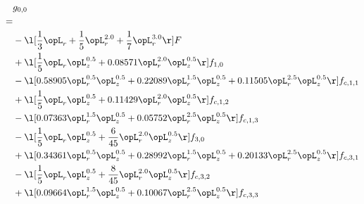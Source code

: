 \begin{alignat}{2} 
\label{eq:g_00_0} 
& g_{0,0} \nonumber \\ 
 = \\ 
& - \l[ \frac{1}{3} \opL_r + \frac{1}{5} \opL_r^{2.0} + \frac{1}{7} \opL_r^{3.0}  \r] F \nonumber \\ 
& + \l[ \frac{1}{5} \opL_r \opL_z^{0.5} +  0.08571 \opL_r^{2.0} \opL_z^{0.5}  \r] f_{1,0} \nonumber \\ 
& - \l[  0.58905 \opL_r^{0.5} \opL_z^{0.5} +  0.22089 \opL_r^{1.5} \opL_z^{0.5} +  0.11505 \opL_r^{2.5} \opL_z^{0.5}  \r] f_{c,1,1} \nonumber \\ 
& + \l[ \frac{1}{5} \opL_r \opL_z^{0.5} +  0.11429 \opL_r^{2.0} \opL_z^{0.5}  \r] f_{c,1,2} \nonumber \\ 
& - \l[  0.07363 \opL_r^{1.5} \opL_z^{0.5} +  0.05752 \opL_r^{2.5} \opL_z^{0.5}  \r] f_{c,1,3} \nonumber \\ 
& - \l[ \frac{1}{5} \opL_r \opL_z^{0.5} + \frac{6}{45} \opL_r^{2.0} \opL_z^{0.5}  \r] f_{3,0} \nonumber \\ 
& + \l[  0.34361 \opL_r^{0.5} \opL_z^{0.5} +  0.28992 \opL_r^{1.5} \opL_z^{0.5} +  0.20133 \opL_r^{2.5} \opL_z^{0.5}  \r] f_{c,3,1} \nonumber \\ 
& - \l[ \frac{1}{5} \opL_r \opL_z^{0.5} + \frac{8}{45} \opL_r^{2.0} \opL_z^{0.5}  \r] f_{c,3,2} \nonumber \\ 
& + \l[  0.09664 \opL_r^{1.5} \opL_z^{0.5} +  0.10067 \opL_r^{2.5} \opL_z^{0.5}  \r] f_{c,3,3} \nonumber \\ 
\end{alignat} 


